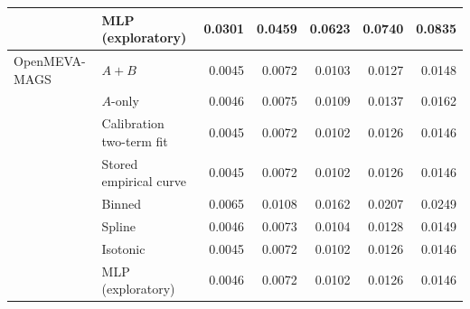 \begin{tabular}{llrrrrr}
 & MLP (exploratory) & 0.0301 & 0.0459 & 0.0623 & 0.0740 & 0.0835 \\
\midrule
OpenMEVA-MAGS & $A{+}B$ & 0.0045 & 0.0072 & 0.0103 & 0.0127 & 0.0148 \\
 & $A$-only & 0.0046 & 0.0075 & 0.0109 & 0.0137 & 0.0162 \\
 & Calibration two-term fit & 0.0045 & 0.0072 & 0.0102 & 0.0126 & 0.0146 \\
 & Stored empirical curve & 0.0045 & 0.0072 & 0.0102 & 0.0126 & 0.0146 \\
 & Binned & 0.0065 & 0.0108 & 0.0162 & 0.0207 & 0.0249 \\
 & Spline & 0.0046 & 0.0073 & 0.0104 & 0.0128 & 0.0149 \\
 & Isotonic & 0.0045 & 0.0072 & 0.0102 & 0.0126 & 0.0146 \\
 & MLP (exploratory) & 0.0046 & 0.0072 & 0.0102 & 0.0126 & 0.0146 \\
\bottomrule
\end{tabular}
